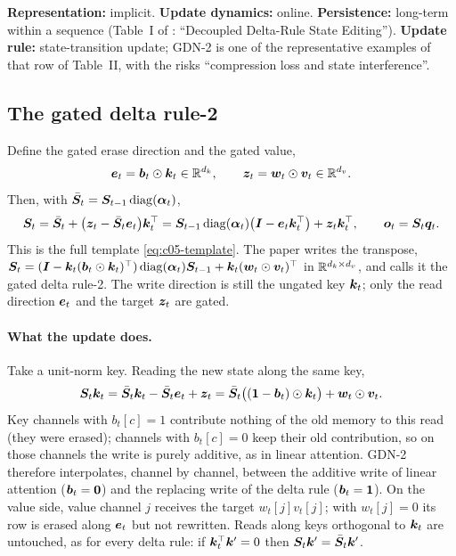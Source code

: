 \begin{taxonomy}
\textbf{Representation:} implicit. \textbf{Update dynamics:} online. \textbf{Persistence:}
long-term within a sequence (Table~I of \citet{zhoubian2026memory}: ``Decoupled Delta-Rule State
Editing''). \textbf{Update rule:} state-transition update; GDN-2 is one of the representative
examples of that row of Table~II, with the risks ``compression loss and state interference''.
\end{taxonomy}

\subsection{The gated delta rule-2}\label{sec:c05-gdn2-rule}

Define the gated erase direction and the gated value,
\begin{equation}\label{eq:c05-gdn2-ez}
  \bm{e}_t = \bm{b}_t\odot\bm{k}_t \in \mathbb{R}^{d_k},\qquad \bm{z}_t = \bm{w}_t\odot\bm{v}_t \in \mathbb{R}^{d_v}.
\end{equation}
Then, with $\bar{\bm{S}}_t = \bm{S}_{t-1}\operatorname{diag}(\bm{\alpha}_t)$,
\begin{equation}\label{eq:c05-gdn2}
  \bm{S}_t = \bar{\bm{S}}_t + \big(\bm{z}_t - \bar{\bm{S}}_t\bm{e}_t\big)\bm{k}_t^{\top}
        = \bm{S}_{t-1}\operatorname{diag}(\bm{\alpha}_t)\big(\bm{I} - \bm{e}_t\bm{k}_t^{\top}\big) + \bm{z}_t\bm{k}_t^{\top} ,
  \qquad \bm{o}_t = \bm{S}_t\bm{q}_t .
\end{equation}
This is the full template \cref{eq:c05-template}. The paper writes the transpose,
$\bm{S}_t = (\bm{I} - \bm{k}_t(\bm{b}_t\odot\bm{k}_t)^{\top})\operatorname{diag}(\bm{\alpha}_t)\bm{S}_{t-1} + \bm{k}_t(\bm{w}_t\odot\bm{v}_t)^{\top}$ in
$\mathbb{R}^{d_k\times d_v}$, and calls it the gated delta rule-2. The write direction is still the
ungated key $\bm{k}_t$; only the read direction $\bm{e}_t$ and the target $\bm{z}_t$ are gated.

\paragraph{What the update does.} Take a unit-norm key. Reading the new state along the same key,
\begin{equation}\label{eq:c05-gdn2-read}
  \bm{S}_t\bm{k}_t = \bar{\bm{S}}_t\bm{k}_t - \bar{\bm{S}}_t\bm{e}_t + \bm{z}_t
             = \bar{\bm{S}}_t\big((\mathbf 1 - \bm{b}_t)\odot\bm{k}_t\big) + \bm{w}_t\odot\bm{v}_t .
\end{equation}
Key channels with $b_t[c] = 1$ contribute nothing of the old memory to this read (they were
erased); channels with $b_t[c] = 0$ keep their old contribution, so on those channels the write is
purely additive, as in linear attention. GDN-2 therefore interpolates, channel by channel, between
the additive write of linear attention ($\bm{b}_t = \mathbf 0$) and the replacing write of the delta
rule ($\bm{b}_t = \mathbf 1$). On the value side, value channel $j$ receives the target
$w_t[j]v_t[j]$; with $w_t[j] = 0$ its row is erased along $\bm{e}_t$ but not rewritten. Reads along
keys orthogonal to $\bm{k}_t$ are untouched, as for every delta rule: if $\bm{k}_t^{\top}\bm{k}' = 0$ then
$\bm{S}_t\bm{k}' = \bar{\bm{S}}_t\bm{k}'$.

